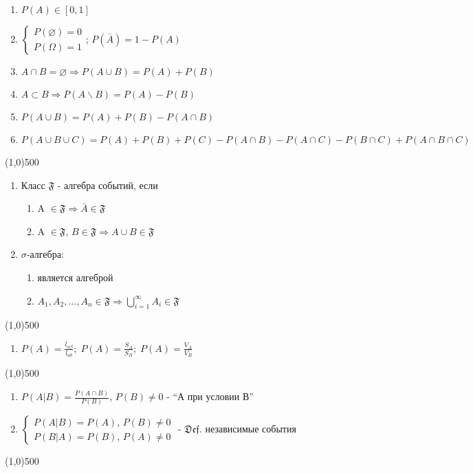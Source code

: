 \newpage
\begin{enumerate}
\item $P(A)\in [0,1]$
\item $\left\{\begin{array}{l} P(\varnothing)=0\\P(\Omega)=1 \end{array}\right.$; $ P(\bar{A})=1-P(A) $
\item $A\cap B=\varnothing \Rightarrow P(A\cup B)=P(A)+P(B)$
\item $A\subset B\Rightarrow P(A\backslash B)=P(A)-P(B)$
\item $P(A\cup B)=P(A)+P(B)-P(A\cap B)$
\item $P(A\cup B\cup C)=P(A)+P(B)+P(C)-P(A\cap B)-P(A\cap C)-P(B\cap C)+P(A\cap B\cap C)$
\end{enumerate}
\line(1,0){500}
\begin{enumerate}
\item Класс $\mathfrak{F}$ - алгебра событий, если
      \begin{enumerate}
      \item A $\in \mathfrak{F} \Rightarrow \bar{A} \in \mathfrak{F}$
      \item A $\in \mathfrak{F},\, B \in \mathfrak{F} \Rightarrow A\cup B\in \mathfrak{F}$
      \end{enumerate}
\item $\sigma$-алгебра:
      \begin{enumerate}
      \item является алгеброй
      \item $A_1,A_2,...,A_n \in \mathfrak{F} \Rightarrow \bigcup\limits_{i=1}^\infty A_i \in \mathfrak{F}$
      \end{enumerate}
\end{enumerate}
\line(1,0){500}
\begin{enumerate}
\item $ P(A) = \frac{l_{\alpha\beta}}{l_{ab}};\;P(A)=\frac{S_A}{S_B};\; P(A) = \frac{V_A}{V_B} $\\
\end{enumerate}
\line(1,0){500}
\begin{enumerate}
\item $P(A|B)=\frac{P(A\cap B)}{P(B)},\,P(B)\neq 0$ - ``А при условии В''
\item $\left\{\begin{array}{l}
            P(A|B)=P(A),\,P(B)\neq 0\\
            P(B|A)=P(B),\,P(A)\neq 0
      \end{array}\right. $ - $ \mathfrak{Def.}$ независимые события
\end{enumerate}
\vfill\line(1,0){500}

